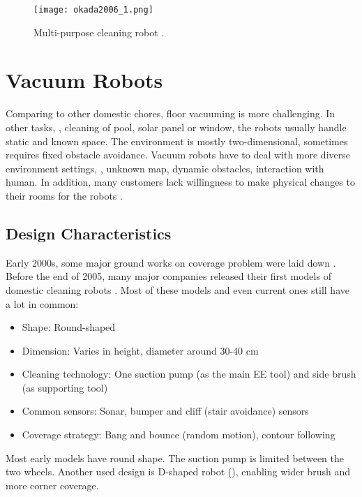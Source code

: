 \begin{figure}[!htb]
	\centering
	\texttt{[image: okada2006\_1.png]}
	\caption{Multi-purpose cleaning robot \cite{okada2006}.}
	\label{fig:okada2006_1}
\end{figure}

\section{Vacuum Robots}
\label{sec:vacuum_robots}

Comparing to other domestic chores, floor vacuuming is more challenging. In other tasks, \eg, cleaning of pool, solar panel or window, the robots usually handle static and known space. The environment is mostly two-dimensional, sometimes requires fixed obstacle avoidance. Vacuum robots have to deal with more diverse environment settings, \eg, unknown map, dynamic obstacles, interaction with human. In addition, many customers lack willingness to make physical changes to their rooms for the robots \cite{vaussard2014ras}.

\subsection{Design Characteristics}
Early 2000s, some major ground works on coverage problem were laid down \cite{huang1986icra, zelinsky1993icar, choset2000ar, gabriely2002icra}. Before the end of 2005, many major companies released their first models of domestic cleaning robots \cite{siciliano2016}. Most of these models and even current ones still have a lot in common:
\begin{itemize}
	\setlength\itemsep{0em}
	\item Shape: Round-shaped
	\item Dimension: Varies in height, diameter around 30-40 cm
	\item Cleaning technology: One suction pump (as the main \ac{EE} tool) and side brush (as supporting tool)
	\item Common sensors: Sonar, bumper and cliff (stair avoidance) sensors
	\item Coverage strategy: Bang and bounce (random motion), contour following
\end{itemize}

Most early models have round shape. The suction pump is limited between the two wheels. Another used design is D-shaped robot (), enabling wider brush and more corner coverage.

